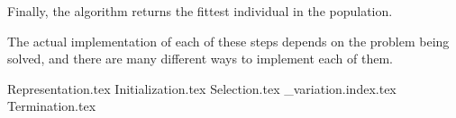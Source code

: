   Finally, the algorithm returns the fittest individual in the population.

  The actual implementation of each of these steps depends on the problem being solved, and there
  are many different ways to implement each of them.

  {Representation.tex}
  {Initialization.tex}
  {Selection.tex}
  {_variation.index.tex}
  {Termination.tex}
